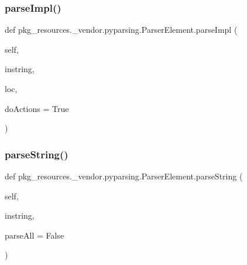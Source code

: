 \subsubsection{\texorpdfstring{parse\+Impl()}{parseImpl()}}
{\footnotesize\ttfamily def pkg\+\_\+resources.\+\_\+vendor.\+pyparsing.\+Parser\+Element.\+parse\+Impl (\begin{DoxyParamCaption}\item[{}]{self,  }\item[{}]{instring,  }\item[{}]{loc,  }\item[{}]{do\+Actions = {\ttfamily True} }\end{DoxyParamCaption})}

\mbox{\label{classpkg__resources_1_1__vendor_1_1pyparsing_1_1ParserElement_a10680bb4fd394b631357d464b399e63a}} 
\subsubsection{\texorpdfstring{parse\+String()}{parseString()}}
{\footnotesize\ttfamily def pkg\+\_\+resources.\+\_\+vendor.\+pyparsing.\+Parser\+Element.\+parse\+String (\begin{DoxyParamCaption}\item[{}]{self,  }\item[{}]{instring,  }\item[{}]{parse\+All = {\ttfamily False} }\end{DoxyParamCaption})}

